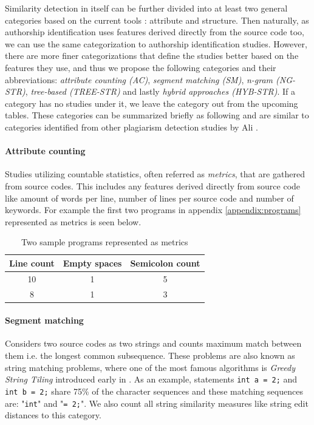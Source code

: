 Similarity detection in itself can be further divided into at least two general categories based on the current tools \cite{RSCAD2016}: attribute and structure. Then naturally, as authorship identification uses features derived directly from the source code too, we can use the same categorization to authorship identification studies. However, there are more finer categorizations that define the studies better based on the features they use, and thus we propose the following categories and their abbreviations: \emph{attribute counting (AC)}, \emph{segment matching (SM)}, \emph{n-gram (NG-STR)}, \emph{tree-based (TREE-STR)} and lastly \emph{hybrid approaches (HYB-STR)}. If a category has no studies under it, we leave the category out from the upcoming tables. These categories can be summarized briefly as following and are similar to categories identified from other plagiarism detection studies by Ali \etal \cite{OCPOCP2011}. 

\paragraph{Attribute counting}
Studies utilizing countable statistics, often referred as \emph{metrics}, that are gathered from source codes. This includes any features derived directly from source code like amount of words per line, number of lines per source code and number of keywords. For example the first two programs in appendix \ref{appendix:programs} represented as metrics is seen below.

\begin{table}[ht]
    \centering
    \begin{tabular}{|c|c|c|} \hline
        \textbf{Line count} & \textbf{Empty spaces} & \textbf{Semicolon count}\\ \hline
         10 & 1 & 5 \\ \hline
         8 & 1 & 3\\ \hline
    \end{tabular}
    \caption{Two sample programs represented as metrics}
    \label{tab:my_label}
\end{table}

\paragraph{Segment matching}
Considers two source codes as two strings and counts maximum match between them i.e. the longest common subsequence. These problems are also known as string matching problems, where one of the most famous algorithms is \emph{Greedy String Tiling} introduced early in \cite{SSGST1993}. As an example, statements \texttt{int a = 2;} and \texttt{int b = 2;} share 75\% of the character sequences and these matching sequences are: "\texttt{int}" and "\texttt{= 2;}". We also count all string similarity measures like string edit distances  to this category.

